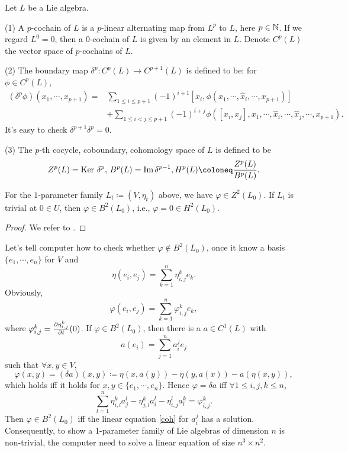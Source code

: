   \begin{definition}Let $L$ be a Lie algebra.
  \item[(1)]A $p$-cochain of $L$ is a $p$-linear alternating map from $L^p$ to $L$, here $p\in \mathbb N$.  If we regard $L^0=0$, then a $0$-cochain of $L$ is given by an element in $L$. Denote $C^p(L)$ the vector space of $p$-cochains of $L$. 
  \item[(2)]The boundary map $\delta^p\colon C^p(L) \to C^{p+1}(L)$ is defined to be: for $\phi \in C^p(L)$, 
    \begin{align*}
      (\delta^p \phi)(x_1,\cdots, x_{p+1})=&\sum_{1\leqslant i \leqslant p+1} (-1)^{i+1}\left[x_i, \phi(x_1, \cdots, \hat x_i,\cdots, x_{p+1})\right]\\
                                           &+\sum_{1\leqslant i <j \leqslant p+1} (-1)^{i+j} \phi([x_i,x_j], x_1,\cdots, \hat x_i ,\cdots, \hat x_j ,\cdots, x_{p+1}).
    \end{align*}
  It's easy to check $\delta^{p+1}\delta^p=0$.
\item[(3)]The $p$-th cocycle, coboundary, cohomology space of $L$ is defined to be
  \[Z^p(L)=\Ker \delta^{p},\,
    B^p(L)=\mathrm{Im}\,  \delta^{p-1},
  H^p(L)\coloneq \frac{Z^p(L)}{B^p(L) }.\]

\end{definition}

\begin{lemma}\label{lem-3.4}
  For the $1$-parameter family $L_t\coloneq \left( V, \eta_t\right)$ above,  we have $\varphi\in Z^2\left(L_0\right)$. If $L_t$ is  trivial at $0\in U$, then $\varphi\in B^2\left(L_0\right)$, i.e., $\varphi=0\in H^2\left(L_0\right)$.
\end{lemma}
\begin{proof}
  We refer to \cite[16-17]{BN}.
\end{proof}

Let's tell computer how to check whether $\varphi\not\in B^2(L_0)$, once it know a basis $\{e_1,\cdots, e_n\}$ for $V$ and 
\[\eta(e_i,e_j)=\sum_{k=1}^n\eta_{i,j}^k e_k.\]
Obviously, 
\[\varphi(e_i,e_j)= \sum_{k=1}^n\varphi_{i,j}^ke_k,\]
where $\varphi_{i,j}^k = \frac{\partial \eta_{i,j}^k}{\partial t}(0)$. If $\varphi \in B^2(L_0)$, then there is a $a\in C^1(L)$ with
\[a(e_i)=\sum_{j=1}^na_i^j e_j\]
such that $\forall x,y\in V$,
\[
  \varphi(x,y)=\left(\delta a\right)(x,y)\coloneq \eta\left(x,a(y)\right)-\eta(y,a(x))-a(\eta(x,y) ),
\]
which holds iff it holds for $x,y \in \{e_1,\cdots, e_n\}$. Hence $\varphi=\delta a $ iff $\forall 1\leqslant i ,j, k \leqslant n$, 
\begin{equation}\label{coh}
  \sum_{l=1}^n \eta_{i,l}^k a_j^l-\eta_{j,l}^ka_i^l-\eta_{i,j}^la_l^k=\varphi_{i,j}^k.
\end{equation}
Then $\varphi \in B^2(L_0)$ iff the linear equation \eqref{coh} for $a_i^j$ has a solution. Consequently, to show a 1-parameter family of Lie algebras of dimension $n$ is non-trivial, the computer need to solve a linear equation of size $n^3\times n^2$.

